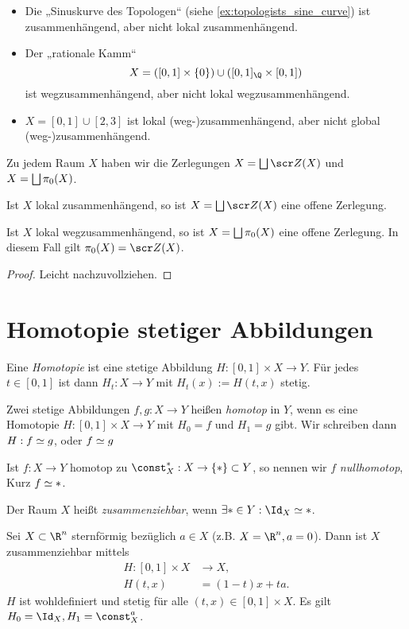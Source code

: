 \begin{ex}
	\begin{itemize}
		\item
			Die „Sinuskurve des Topologen“ (siehe \ref{ex:topologists_sine_curve}) ist zusammenhängend, aber nicht lokal zusammenhängend.
		\item
			Der „rationale Kamm“
			\[
				X = ([0,1] \times \{0\}) \cup ([0,1]_\Q \times [0,1])
			\]
			ist wegzusammenhängend, aber nicht lokal wegzusammenhängend.
		\item
			$X = [0,1] \cup [2,3]$ ist lokal (weg-)zusammenhängend, aber nicht global (weg-)zusammenhängend.
	\end{itemize}
\end{ex}

Zu jedem Raum $X$ haben wir die Zerlegungen $X = \bigdunion \scr Z(X)$ und $X = \bigsqcup \pi_0(X)$.

\begin{st}
	Ist $X$ lokal zusammenhängend, so ist $X = \bigdunion \scr Z(X)$ eine offene Zerlegung.

	Ist $X$ lokal wegzusammenhängend, so ist $X = \bigsqcup \pi_0(X)$ eine offene Zerlegung.
	In diesem Fall gilt $\pi_0(X) = \scr Z(X)$.
	\begin{proof}
		Leicht nachzuvollziehen.
	\end{proof}
\end{st}


\section{Homotopie stetiger Abbildungen}


\begin{df}
	Eine \emph{Homotopie} ist eine stetige Abbildung $H: [0,1] \times X \to Y$.
	Für jedes $t \in [0,1]$ ist dann $H_t: X \to Y$ mit $H_t(x) := H(t,x)$ stetig.

	Zwei stetige Abbildungen $f,g : X \to Y$ heißen \emph{homotop} in $Y$, wenn es eine Homotopie $H: [0,1] \times X \to Y$ mit $H_0 = f$ und $H_1 = g$ gibt.
	Wir schreiben dann $H: f \simeq g$, oder $f\simeq g$

	Ist $f: X \to  Y$ homotop zu $\const_X^{\ast}: X \to \{\ast\} \subset Y$, so nennen wir $f$ \emph{nullhomotop}, Kurz $f \simeq \ast$.

	Der Raum $X$ heißt \emph{zusammenziehbar}, wenn $\exists * \in Y: \Id_X \homotopic \ast$.
\end{df}

\begin{ex} \label{st:starlike_contractible}
	Sei $X \subset \R^n$ sternförmig bezüglich $a \in X$ (z.B. $X = \R^n, a = 0$).
	Dann ist $X$ zusammenziehbar mittels
	\begin{align*}
		H: [0,1] \times X &\to X, \\
		H(t,x) &= (1-t)x + ta.
	\end{align*}
	$H$ ist wohldefiniert und stetig für alle $(t,x) \in [0,1] \times X$.
	Es gilt $H_0 = \Id_X, H_1 = \const_X^{a}$.
\end{ex}

